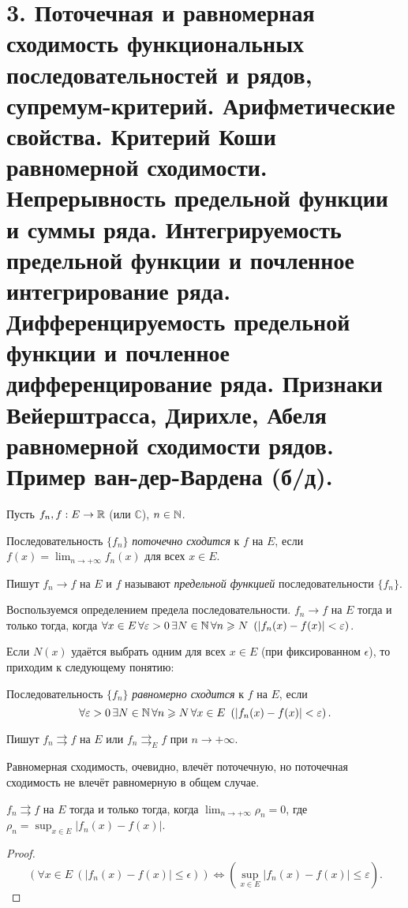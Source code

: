 \section{3. Поточечная и равномерная сходимость функциональных последовательностей и рядов, супремум-критерий. Арифметические свойства. Критерий Коши равномерной сходимости. Непрерывность предельной функции и суммы ряда. Интегрируемость предельной функции и почленное интегрирование ряда. Дифференцируемость предельной функции и почленное дифференцирование ряда. Признаки Вейерштрасса, Дирихле, Абеля равномерной сходимости рядов. Пример ван-дер-Вардена (б/д).}

Пусть $f_n, f : E \rightarrow \mathbb{R}$ (или $\mathbb{C}$), $n \in \mathbb{N}$.
\begin{definition}
    Последовательность $\{f_n\}$ \emph{поточечно сходится} к $f$ на $E$, если $f(x) = \lim_{n \rightarrow {+\infty}} f_n(x)$ для всех $x \in E$.

    Пишут $f_n \rightarrow f$ на $E$ и $f$ называют \emph{предельной функцией} последовательности $\{f_n\}$.
\end{definition}

Воспользуемся определением предела последовательности. $f_n \rightarrow f$ на $E$ тогда и только тогда, когда $\forall x \in E \, \forall \epsilon > 0 \, \exists N \in \N \, \forall n \ge N \ \left(|f_n(x) - f(x)| < \epsilon\right)$.

Если $N(x)$ удаётся выбрать одним для всех $x \in E$ (при фиксированном $\epsilon$), то приходим к следующему понятию:

\begin{definition}
    Последовательность $\{f_n\}$ \emph{равномерно сходится} к $f$ на $E$, если
    \[
        \forall \varepsilon > 0 \, \exists N \in \mathbb{N} \, \forall n \geqslant N \, \forall x \in E \ \left(|f_n(x) - f(x)| < \varepsilon\right).
    \]

    Пишут $f_n \rightrightarrows f$ на $E$ или $f_n \rightrightarrows_E f$ при $n \rightarrow {+\infty}$.
\end{definition}

\begin{note}
    Равномерная сходимость, очевидно, влечёт поточечную, но поточечная сходимость не влечёт равномерную в общем случае.
\end{note}

\begin{lemma}
    \label{sup-criterion}
    $f_n \rightrightarrows f$ на $E$ тогда и только тогда, когда $\lim_{n \rightarrow {+\infty}} \rho_n = 0$, где $\rho_n = \sup_{x \in E} |f_n(x) - f(x)|$.

    \begin{proof}
        \[
            \left(\forall x \in E \ \left(|f_n(x) - f(x)| \le \epsilon\right)\right) \Leftrightarrow \left(\sup_{x \in E} |f_n(x) - f(x)| \le \varepsilon\right).
        \]
    \end{proof}
\end{lemma}


